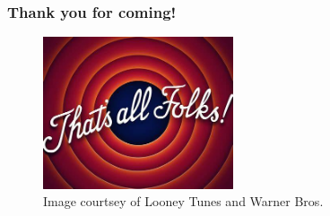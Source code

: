 \documentclass[hyperref={colorlinks,citecolor=blue,linkcolor=blue,urlcolor=blue}, aspectratio=1610]{beamer}
\begin{document}
\begin{frame}
  \frametitle{Thank you for coming!}
  \centering
  \begin{figure}
    \includegraphics[width=0.5\textwidth]{that's_all_folks.jpeg}
    \caption{Image courtsey of Looney Tunes\texttrademark{} and Warner Bros.\texttrademark{}}
  \end{figure}

\end{frame}
\end{document}
